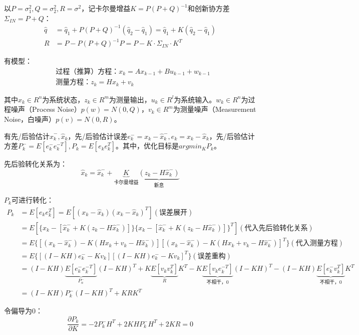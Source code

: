 \documentclass[
12pt, %
a4paper, 
oneside, %
headinclude,footinclude, %
]{scrartcl}
\begin{document}
以$ P = \sigma_1^2, Q = \sigma_2^2, R = \sigma^2 $，记卡尔曼增益$ K = P(P + Q)^{-1} $和创新协方差$ \Sigma_{IN} = P + Q $：
\begin{align*}
\hat{q} &= \hat{q}_1 + P(P + Q)^{-1}(\hat{q}_2 - \hat{q}_1) = \hat{q}_1 + K(\hat{q}_2 - \hat{q}_1) \\
R &= P - P(P + Q)^{-1}P = P - K \cdot \Sigma_{IN} \cdot K^T
\end{align*}

有模型：
\begin{align*}
&\text{过程（推算）方程：}x_k = A x_{k - 1} + B u_{k - 1} + w_{k - 1} \\
&\text{测量方程：}z_k = H x_k + v_k
\end{align*}

其中$ x_k \in R^n $为系统状态，$ z_k \in R^m $为测量输出，$ u_k \in R^l $为系统输入。$ w_k \in R^n $为过程噪声（Process Noise）$ p(w) = N(0, Q) $，$ v_k \in R^m $为测量噪声（Measurement Noise，白噪声）$ p(v) = N(0, R) $。

有先/后验估计$ \hat{x}_k^-, \hat{x}_k $，先/后验估计误差$ e_k^- = x_k - \hat{x}_k^-, e_k = x_k - \hat{x}_k $，先/后验估计方差$ P_k^- = E[e_k^- e_k^{-T}], P_k = E[e_k e_k^T] $。其中，优化目标是$ argmin_K P_k $。

先后验转化关系为：
$$ \hat{x}_k = \hat{x}_k^- + \underbrace{K}_{\text{卡尔曼增益}}\underbrace{(z_k - H \hat{x}_k^-)}_{\text{新息}} $$

$ P_k $可进行转化：
\begin{align*}
P_k &= E[e_k e_k^T] = E[(x_k - \hat{x}_k)(x_k - \hat{x}_k)^T] (\text{误差展开}) \\
&= E[\{x_k - [\hat{x}_k^- + K(z_k - H\hat{x}_k^-)]\} \{x_k - [\hat{x}_k^- + K(z_k - H\hat{x}_k^-)]\}^T] (\text{代入先后验转化关系}) \\
&= E\{[(x_k - \hat{x}_k^-) - K(H x_k + v_k - H \hat{x}_k^-)][(x_k - \hat{x}_k^-) - K(H x_k + v_k - H \hat{x}_k^-)]^T\} (\text{代入测量方程}) \\
&= E\{[(I - KH)e_k^- - Kv_k][(I - KH)e_k^- - Kv_k]^T\} (\text{误差重构}) \\
&= (I - KH) \underbrace{E[e_k^- e_k^{-T}]}_{P_n^-} (I - KH)^T + K \underbrace{E[v_k v_k^T]}_{R} K^T - K \underbrace{E[v_k e_k^{-T}]}_{\text{不相干，}0} (I - KH)^T -(I - KH) \underbrace{E[e_k^- v_k^T]}_{\text{不相干，}0} K^T \\
&= (I - KH)P_k^-(I - KH)^T + KRK^T
\end{align*}

令偏导为$ 0 $：
$$ \frac{\partial P_k}{\partial K} = -2P_k^- H^T + 2K H P_k^- H^T + 2KR = 0 $$
\end{document}
